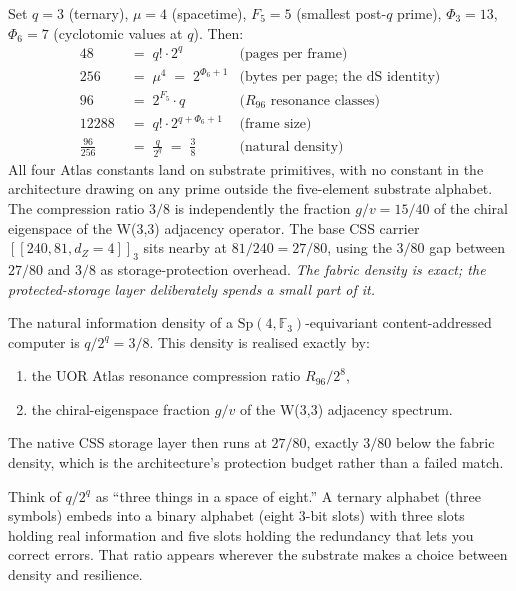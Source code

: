 \documentclass[11pt,letterpaper]{article}
\theoremstyle{remark}
\newcommand{\Sp}{\mathrm{Sp}}
\newcommand{\FF}{\mathbb{F}}
\begin{document}
Set $q = 3$ (ternary), $\mu = 4$ (spacetime), $F_5 = 5$ (smallest post-$q$ prime),
$\Phi_3 = 13$, $\Phi_6 = 7$ (cyclotomic values at $q$). Then:
\begin{align*}
48     &\;=\; q! \cdot 2^q                       &\text{(pages per frame)}\\
256    &\;=\; \mu^4 \;=\; 2^{\Phi_6 + 1}          &\text{(bytes per page; the dS identity)}\\
96     &\;=\; 2^{F_5} \cdot q                     &\text{($R_{96}$ resonance classes)}\\
12288  &\;=\; q! \cdot 2^{q + \Phi_6 + 1}         &\text{(frame size)}\\[2pt]
\frac{96}{256} &\;=\; \frac{q}{2^q} \;=\; \frac{3}{8} &\text{(natural density)}
\end{align*}
All four Atlas constants land on substrate primitives, with no constant in the architecture
drawing on any prime outside the five-element substrate alphabet. The compression ratio
$3/8$ is independently the fraction $g/v = 15/40$ of the chiral eigenspace of the W(3,3)
adjacency operator. The base CSS carrier $[[240, 81, d_Z=4]]_3$ sits nearby at
$81/240 = 27/80$, using the $3/80$ gap between $27/80$ and $3/8$ as storage-protection
overhead. \emph{The fabric density is exact; the protected-storage layer deliberately
spends a small part of it.}

\begin{keyresult}
The natural information density of a $\Sp(4,\FF_3)$-equivariant content-addressed
computer is $\boxed{q/2^q = 3/8}$. This density is realised exactly by:
\begin{enumerate}[label=(\roman*),leftmargin=2em,nosep]
\item the UOR Atlas resonance compression ratio $R_{96}/2^8$,
\item the chiral-eigenspace fraction $g/v$ of the W(3,3) adjacency spectrum.
\end{enumerate}
The native CSS storage layer then runs at $27/80$, exactly $3/80$ below the fabric density,
which is the architecture's protection budget rather than a failed match.
\end{keyresult}

\begin{intuition}
Think of $q/2^q$ as ``three things in a space of eight.'' A ternary alphabet (three
symbols) embeds into a binary alphabet (eight $3$-bit slots) with three slots holding
real information and five slots holding the redundancy that lets you correct errors.
That ratio appears wherever the substrate makes a choice between density and resilience.
\end{intuition}
\end{document}
